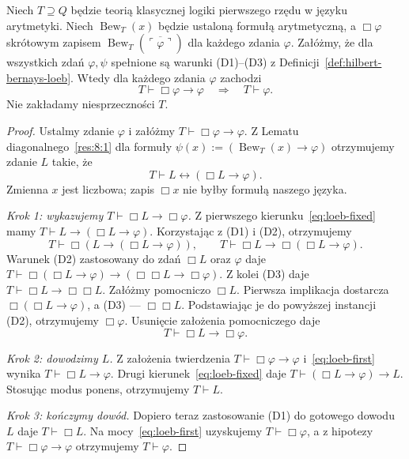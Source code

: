 \begin{twierdzenie}\label{thm:loeb}
Niech $T\supseteq Q$ będzie teorią klasycznej
logiki pierwszego rzędu w języku arytmetyki.
Niech $\operatorname{Bew}_T(x)$ będzie ustaloną
formułą arytmetyczną, a $\Box\varphi$
skrótowym zapisem
$\operatorname{Bew}_T(\overline{\ulcorner\varphi\urcorner})$
dla każdego zdania $\varphi$. Załóżmy, że dla wszystkich
zdań $\varphi,\psi$ spełnione są warunki (D1)--(D3)
z Definicji~\ref{def:hilbert-bernays-loeb}.
Wtedy dla każdego zdania $\varphi$ zachodzi
\[
T\vdash\Box\varphi\to\varphi
\quad\Longrightarrow\quad T\vdash\varphi.
\]
Nie zakładamy niesprzeczności $T$.
\end{twierdzenie}
\begin{proof}
Ustalmy zdanie $\varphi$ i załóżmy
$T\vdash\Box\varphi\to\varphi$.
Z Lematu diagonalnego~\ref{res:8:1}
dla formuły
$\psi(x):=(\operatorname{Bew}_T(x)\to\varphi)$
otrzymujemy zdanie $L$ takie, że
\begin{equation}\label{eq:loeb-fixed}
T\vdash L\leftrightarrow(\Box L\to\varphi).
\end{equation}
Zmienna $x$ jest liczbowa; zapis $\Box x$
nie byłby formułą naszego języka.

\emph{Krok 1: wykazujemy $T\vdash\Box L\to\Box\varphi$.}
Z pierwszego kierunku~\eqref{eq:loeb-fixed}
mamy $T\vdash L\to(\Box L\to\varphi)$.
Korzystając z (D1) i (D2), otrzymujemy
\[
T\vdash\Box(L\to(\Box L\to\varphi)),
\qquad
T\vdash\Box L\to\Box(\Box L\to\varphi).
\]
Warunek (D2) zastosowany do zdań $\Box L$
oraz $\varphi$ daje
$T\vdash\Box(\Box L\to\varphi)\to
(\Box\Box L\to\Box\varphi)$.
Z kolei (D3) daje $T\vdash\Box L\to\Box\Box L$.
Załóżmy pomocniczo $\Box L$.
Pierwsza implikacja dostarcza
$\Box(\Box L\to\varphi)$, a (D3) --- $\Box\Box L$.
Podstawiając je do powyższej instancji (D2),
otrzymujemy $\Box\varphi$. Usunięcie
założenia pomocniczego daje
\begin{equation}\label{eq:loeb-first}
T\vdash\Box L\to\Box\varphi.
\end{equation}

\emph{Krok 2: dowodzimy $L$.}
Z założenia twierdzenia
$T\vdash\Box\varphi\to\varphi$
i~\eqref{eq:loeb-first}
wynika $T\vdash\Box L\to\varphi$.
Drugi kierunek~\eqref{eq:loeb-fixed}
daje $T\vdash(\Box L\to\varphi)\to L$.
Stosując modus ponens, otrzymujemy $T\vdash L$.

\emph{Krok 3: kończymy dowód.}
Dopiero teraz zastosowanie (D1)
do gotowego dowodu $L$ daje $T\vdash\Box L$.
Na mocy~\eqref{eq:loeb-first} uzyskujemy
$T\vdash\Box\varphi$, a z hipotezy
$T\vdash\Box\varphi\to\varphi$
otrzymujemy $T\vdash\varphi$.
\end{proof}

